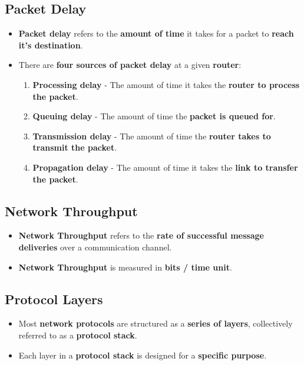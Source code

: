 \documentclass[16pt]{article}
\begin{document}
   \subsection*{Packet Delay}
   \begin{itemize}
       \item \textbf{Packet delay} refers to the \textbf{amount of time} it takes for a packet to \textbf{reach it's destination}.
       \item There are \textbf{four sources of packet delay} at a given \textbf{router}:
       \begin{enumerate}
           \item \textbf{Processing delay} - The amount of time it takes the \textbf{router to process the packet}.
           \item \textbf{Queuing delay} - The amount of time the \textbf{packet is queued for}.
           \item \textbf{Transmission delay} - The amount of time the \textbf{router takes to transmit the packet}.
           \item \textbf{Propagation delay} - The amount of time it takes the \textbf{link to transfer the packet}.
       \end{enumerate}
   \end{itemize}

   \subsection*{Network Throughput}
   \begin{itemize}
       \item \textbf{Network Throughput} refers to the \textbf{rate of successful message deliveries} over a communication channel.
       \item \textbf{Network Throughput} is measured in \textbf{bits / time unit}.
   \end{itemize}

   \subsection*{Protocol Layers}
   \begin{itemize}
       \item Most \textbf{network protocols} are structured as a \textbf{series of layers}, collectively referred to as a \textbf{protocol stack}.
       \item Each layer in a \textbf{protocol stack} is designed for a \textbf{specific purpose}.
   \end{itemize}
\end{document}
